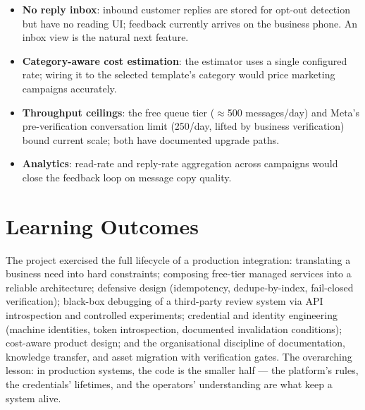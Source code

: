 \documentclass[11pt,a4paper]{article}
\begin{document}
\begin{itemize}[nosep]
  \item \textbf{No reply inbox}: inbound customer replies are stored for
        opt-out detection but have no reading UI; feedback currently
        arrives on the business phone. An inbox view is the natural next
        feature.
  \item \textbf{Category-aware cost estimation}: the estimator uses a
        single configured rate; wiring it to the selected template's
        category would price marketing campaigns accurately.
  \item \textbf{Throughput ceilings}: the free queue tier ($\approx$500
        messages/day) and Meta's pre-verification conversation limit
        (250/day, lifted by business verification) bound current scale;
        both have documented upgrade paths.
  \item \textbf{Analytics}: read-rate and reply-rate aggregation across
        campaigns would close the feedback loop on message copy quality.
\end{itemize}

\section{Learning Outcomes}

The project exercised the full lifecycle of a production integration:
translating a business need into hard constraints; composing free-tier
managed services into a reliable architecture; defensive design
(idempotency, dedupe-by-index, fail-closed verification); black-box
debugging of a third-party review system via API introspection and
controlled experiments; credential and identity engineering (machine
identities, token introspection, documented invalidation conditions);
cost-aware product design; and the organisational discipline of
documentation, knowledge transfer, and asset migration with verification
gates. The overarching lesson: in production systems, the code is the
smaller half --- the platform's rules, the credentials' lifetimes, and
the operators' understanding are what keep a system alive.
\end{document}
